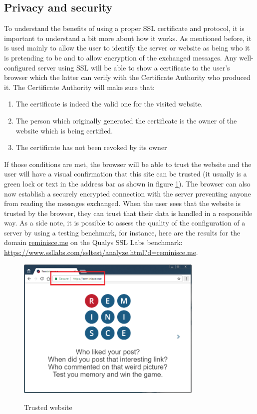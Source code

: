 \subsection{Privacy and security}\label{subsec:privacy}
To understand the benefits of using a proper SSL certificate and protocol, it is important to understand a bit more about how it works. As mentioned before, it is used mainly to allow the user to identify the server or website as being who it is pretending to be and to allow encryption of the exchanged messages. Any well-configured server using SSL will be able to show a certificate to the user's browser which the latter can verify with the Certificate Authority who produced it. The Certificate Authority will make sure that:
\begin{enumerate}
	\item The certificate is indeed the valid one for the visited website.
	\item The person which originally generated the certificate is the owner of the website which is being certified.
	\item The certificate has not been revoked by its owner
\end{enumerate}
If those conditions are met, the browser will be able to trust the website and the user will have a visual confirmation that this site can be trusted (it usually is a green lock or text in the address bar as shown in figure \ref{fig:sslBar}). The browser can also now establish a securely encrypted connection with the server preventing anyone from reading the messages exchanged. When the user sees that the website is trusted by the browser, they can trust that their data is handled in a responsible way. As a side note, it is possible to assess the quality of the configuration of a server by using a testing benchmark, for instance, here are the results for the domain \url{reminisce.me} on the Qualys SSL Labs benchmark\cite{ssllabs}: \url{https://www.ssllabs.com/ssltest/analyze.html?d=reminisce.me}.
\begin{figure}
\centering
{\includegraphics[width=3.5in]{images/ssl_bar.png}}
\caption{Trusted website}
\label{fig:sslBar}
\end{figure}
